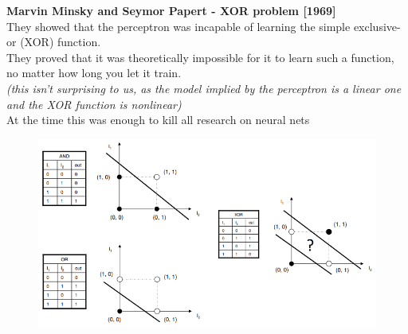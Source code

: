 \documentclass[10pt, compress]{beamer}
\begin{document}
\begin{frame}

\vspace*{.5cm}
\textbf{Marvin Minsky and Seymor Papert - XOR problem [1969]} \\ \hfill \break
They showed that the perceptron was incapable of learning the simple exclusive-or (XOR) function. \\
They proved that it was theoretically impossible for it to learn such a function, no matter how long you let it train.\\

\textit{(this isn’t surprising to us, as the model implied by the perceptron is a linear one and the XOR function is nonlinear)} \\\hfill \break
At the time this was enough to kill all research on neural nets\\


\end{frame}

\begin{frame}
  \vspace{.5cm}
  \begin{figure}
    \includegraphics[width=1\linewidth]{imgs/xor_1}
  \end{figure}
\end{frame}
\end{document}
